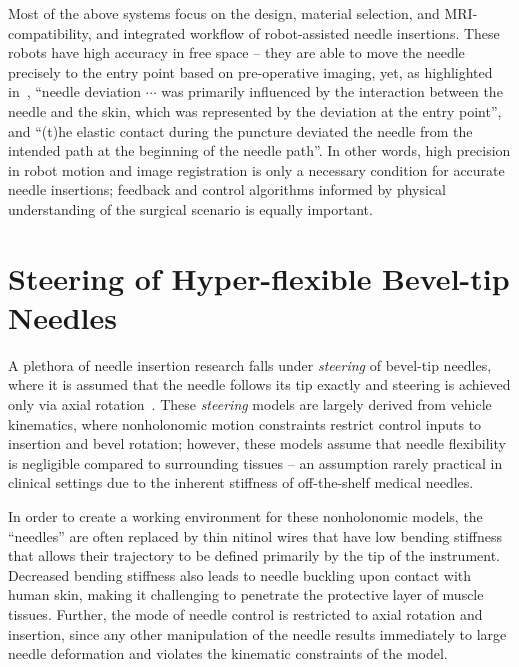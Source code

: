 Most of the above systems focus on the design, material selection, and MRI-compatibility, and integrated workflow of robot-assisted needle insertions. These robots have high accuracy in free space -- they are able to move the needle precisely to the entry point based on pre-operative imaging, yet, as highlighted in~\parencite{moreiraEvaluationRobotAssistedMRIGuided2018}, ``needle deviation $\cdots$ was primarily influenced by the interaction between the needle and the skin, which was represented by the deviation at the entry point'', and ``(t)he elastic contact during the puncture deviated the needle from the intended path at the beginning of the needle path''. In other words, high precision in robot motion and image registration is only a necessary condition for accurate needle insertions; feedback and control algorithms informed by physical understanding of the surgical scenario is equally important.

\section{Steering of Hyper-flexible Bevel-tip Needles}
\label{sec:steering-of-hyperflexible-bevel-tip-needles}

A plethora of needle insertion research falls under \textit{steering} of bevel-tip needles, where it is assumed that the needle follows its tip exactly and steering is achieved only via axial rotation~\parencite{liReviewTechniquesUsed2022}. These \textit{steering} models are largely derived from vehicle kinematics, where nonholonomic motion constraints restrict control inputs to insertion and bevel rotation; however, these models assume that needle flexibility is negligible compared to surrounding tissues -- an assumption rarely practical in clinical settings due to the inherent stiffness of off-the-shelf medical needles.

In order to create a working environment for these nonholonomic models, the ``needles'' are often replaced by thin nitinol wires that have low bending stiffness that allows their trajectory to be defined primarily by the tip of the instrument. Decreased bending stiffness also leads to needle buckling upon contact with human skin, making it challenging to penetrate the protective layer of muscle tissues. Further, the mode of needle control is restricted to axial rotation and insertion, since any other manipulation of the needle results immediately to large needle deformation and violates the kinematic constraints of the model.

